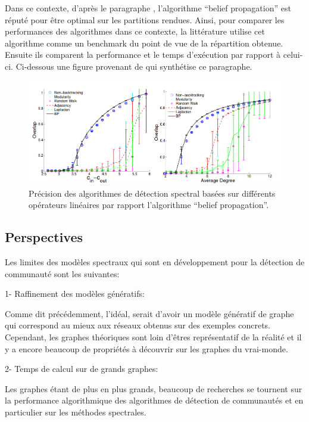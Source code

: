 Dans ce contexte, d'après le paragraphe \cite[Numerical results]{Spectral_Detection_in_the_Censored_Block_Model}, l'algorithme ``belief propagation'' est réputé pour être optimal sur les partitions rendues.
Ainsi, pour comparer les performances des algorithmes dans ce contexte, la littérature utilise cet algorithme comme un benchmark du point de vue de la répartition obtenue.
Ensuite ils comparent la performance et le temps d’exécution par rapport à celui-ci.
Ci-dessous une figure provenant de \cite{Spectral_redemption_clustering_sparse_networks} qui synthétise ce paragraphe.
\begin{figure}[H]
\centering
\includegraphics[scale=0.5]{static/bp_perf.png}
\caption{Précision des algorithmes de détection spectral basées sur différents opérateurs linéaires par rapport l'algorithme ``belief propagation''. \cite{Spectral_redemption_clustering_sparse_networks}}
\end{figure}

\subsection{Perspectives}
Les limites des modèles spectraux qui sont en développement pour la détection de communauté sont les suivantes:
\par{1- Raffinement des modèles génératifs: } 

Comme dit précédemment, l'idéal, serait d'avoir un modèle génératif de graphe qui correspond au mieux aux réseaux obtenus sur des exemples concrets.
Cependant, les graphes théoriques sont loin d'êtres représentatif de la réalité et il y a encore beaucoup de propriétés à découvrir sur les graphes du vrai-monde.\\

\par{2- Temps de calcul sur de grands graphes: } 

Les graphes étant de plus en plus grands, beaucoup de recherches se tournent sur la performance algorithmique des algorithmes de détection de communautés et en particulier sur les méthodes spectrales.\\

